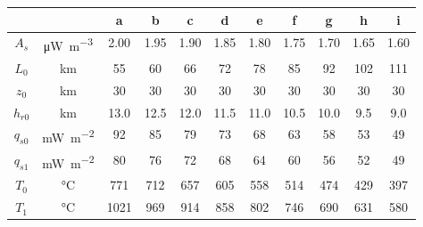 \begin{tabular}{ccccccccccc}
\toprule
& & a & b & c & d & e & f & g & h & i \\
\midrule
$A_{s}$ & \si{\uW\per\m\cubed} & 2.00 & 1.95 & 1.90 & 1.85 & 1.80 & 1.75 & 1.70 & 1.65 & 1.60 \\
$L_{0}$ & \si{\km} & 55 & 60 & 66 & 72 & 78 & 85 & 92 & 102 & 111 \\
$z_{0}$ & \si{\km} & 30 & 30 & 30 & 30 & 30 & 30 & 30 & 30 & 30 \\
$h_{r0}$ & \si{\km} & 13.0 & 12.5 & 12.0 & 11.5 & 11.0 & 10.5 & 10.0 & 9.5 & 9.0 \\
\midrule
$q_{s0}$ & \si{\mW\per\m\squared} & 92 & 85 & 79 & 73 & 68 & 63 & 58 & 53 & 49 \\
$q_{s1}$ & \si{\mW\per\m\squared} & 80 & 76 & 72 & 68 & 64 & 60 & 56 & 52 & 49 \\
$T_{0}$ & \si{\degreeCelsius} & 771 & 712 & 657 & 605 & 558 & 514 & 474 & 429 & 397 \\
$T_{1}$ & \si{\degreeCelsius} & 1021 & 969 & 914 & 858 & 802 & 746 & 690 & 631 & 580 \\
\bottomrule
\end{tabular}
